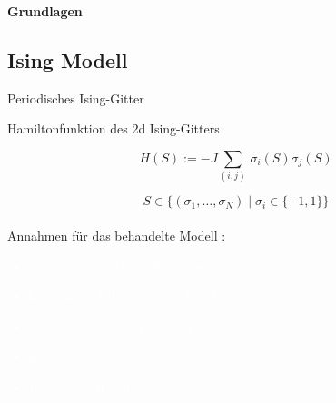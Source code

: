 \documentclass[11pt]{beamer}
\begin{document}
    \begin{frame}
        \centering
        \LARGE
        \textbf{Grundlagen}
    \end{frame}

\subsection{Ising Modell}
    \begin{frame}{Periodisches Ising-Gitter}
        \begin{figure}[h]
            \centering
            
        \end{figure}
    \end{frame}
    
    \begin{frame}{Hamiltonfunktion des 2d Ising-Gitters}
        \begin{grayframe}
            \begin{equation} \nonumber
                H(S) := - J \sum_{(i,j)}  \,\sigma_i(S) \sigma_j(S) 
            \end{equation}
        \end{grayframe}
        \vspace{0.5cm}
        \begin{equation} \nonumber
        S \in \{ \left(\sigma_1, \dots, \sigma_N \right) \;\vert\; \sigma_i \in \{-1,1\} \} 
        \end{equation}\\
        \vspace{0.5cm}
        Annahmen für das behandelte Modell :
        \textcolor{white}{
            \begin{itemize}
                \item Nur nächste Nachbar Wechselwirkung
                \item Isotropie und Homogenität des Modells
                \item Ferromagnetischer Austausch d.h. $J>0$
                \item Kein externes Magnetfeld
                \item Periodische Randbedingungen
            \end{itemize}}
        
    \end{frame}
\end{document}
